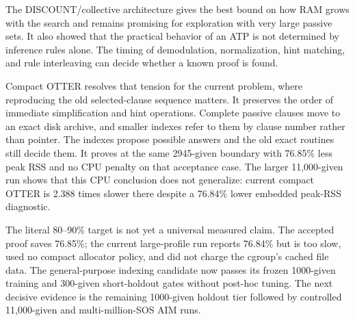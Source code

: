 \documentclass[11pt]{article}
\begin{document}
The DISCOUNT/collective architecture gives the best bound on how RAM grows with
the search and remains promising for exploration with very large passive sets.
It also showed that the practical behavior of an ATP is not determined by
inference rules alone.  The timing of demodulation, normalization, hint
matching, and rule interleaving can decide whether a known proof is found.

Compact OTTER resolves that tension for the current problem, where reproducing
the old selected-clause sequence matters.  It preserves the order of immediate
simplification and hint operations.  Complete passive clauses move to an exact
disk archive, and smaller indexes refer to them by clause number rather than
pointer.  The indexes propose possible answers and the old exact routines still
decide them.  It proves at the same 2945-given boundary with 76.85\% less peak
RSS and no CPU penalty on that acceptance case.  The larger 11,000-given run
shows that this CPU conclusion does not generalize: current compact OTTER is
2.388 times slower there despite a 76.84\% lower embedded peak-RSS diagnostic.

The literal 80--90\% target is not yet a universal measured claim.  The
accepted proof saves 76.85\%; the current large-profile run reports 76.84\%
but is too slow, used no compact allocator policy, and did not charge the
cgroup's cached file data.  The general-purpose indexing candidate now passes
its frozen 1000-given training and 300-given short-holdout gates without
post-hoc tuning.  The next decisive evidence is the remaining 1000-given
holdout tier followed by controlled 11,000-given and multi-million-SOS AIM
runs.
\end{document}
